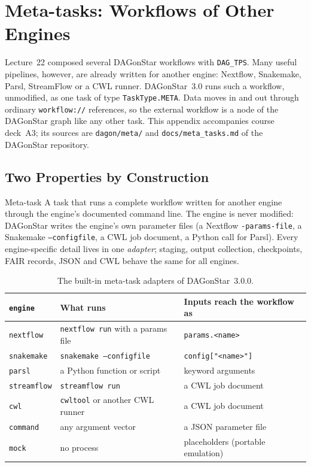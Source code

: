 \chapter{Meta-tasks: Workflows of Other Engines}
\label{app:meta-tasks}

Lecture~22 composed several DAGonStar workflows with \texttt{DAG\_TPS}. Many
useful pipelines, however, are already written for another engine: Nextflow,
Snakemake, Parsl, StreamFlow or a CWL runner. DAGonStar~3.0 runs such a
workflow, unmodified, as one task of type \texttt{TaskType.META}. Data moves in
and out through ordinary \texttt{workflow://} references, so the external
workflow is a node of the DAGonStar graph like any other task. This appendix
accompanies course deck~A3; its sources are \texttt{dagon/meta/} and
\texttt{docs/meta\_tasks.md} of the DAGonStar repository.

\section{Two Properties by Construction}

\begin{definitionbox}{Meta-task}
A task that runs a complete workflow written for another engine through the
engine's documented command line. The engine is never modified: DAGonStar
writes the engine's own parameter files (a Nextflow \texttt{-params-file}, a
Snakemake \texttt{--configfile}, a CWL job document, a Python call for Parsl).
Every engine-specific detail lives in one \emph{adapter}; staging, output
collection, checkpoints, FAIR records, JSON and CWL behave the same for all
engines.
\end{definitionbox}

\begin{table}[h]
\centering
\begin{tabular}{@{}lll@{}}
\toprule
\texttt{engine} & What runs & Inputs reach the workflow as \\
\midrule
\texttt{nextflow} & \texttt{nextflow run} with a params file & \texttt{params.<name>} \\
\texttt{snakemake} & \texttt{snakemake --configfile} & \texttt{config["<name>"]} \\
\texttt{parsl} & a Python function or script & keyword arguments \\
\texttt{streamflow} & \texttt{streamflow run} & a CWL job document \\
\texttt{cwl} & \texttt{cwltool} or another CWL runner & a CWL job document \\
\texttt{command} & any argument vector & a JSON parameter file \\
\texttt{mock} & no process & placeholders (portable emulation) \\
\bottomrule
\end{tabular}
\caption{The built-in meta-task adapters of DAGonStar~3.0.0.}
\label{tab:meta-adapters}
\end{table}

